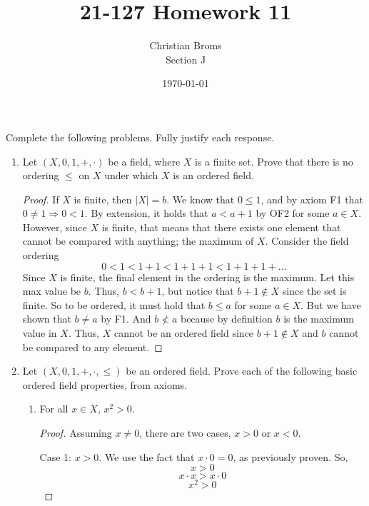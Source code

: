 \documentclass[12pt]{article}
\begin{document}
\title{21-127 Homework 11
}
\author{Christian Broms \\ Section J}
\date{\today}
\maketitle
Complete the following problems. Fully justify each response.


\begin{enumerate}

\item Let $(X, 0, 1, +, \cdot)$ be a field, where $X$ is a finite set. Prove that there is no ordering $\leq$ on $X$ under which $X$ is an ordered field.

\begin{proof}
If $X$ is finite, then $|X| = b$. We know that $0 \leq 1$, and by axiom F1 that $0\neq1 \Rightarrow 0<1$. By extension, it holds that $a < a+1$ by OF2 for some $a \in X$. However, since $X$ is finite, that means that there exists one element that cannot be compared with anything; the maximum of $X$. Consider the field ordering 
$$0 < 1 < 1+1 < 1+1+1< 1+1+1+\ldots$$
Since $X$ is finite, the final element in the ordering is the maximum. Let this max value be $b$. Thus, $b < b+1$, but notice that $b+1 \notin X$ since the set is finite. So to be ordered, it must hold that $b \leq a$ for some $a \in X$. But we have shown that $b\neq a$ by F1. And $b \not< a$ because by definition $b$ is the maximum value in $X$. Thus, $X$ cannot be an ordered field since $b + 1\notin X$ and $b$ cannot be compared to any element. 
\end{proof}

\item Let $(X, 0, 1, +, \cdot, \leq)$ be an ordered field. Prove each of the following basic ordered field properties, from axioms.
\begin{enumerate}
\item For all $x\in X$, $x^2>0$.
\begin{proof}
Assuming $x \neq 0$, 
there are two cases, $x>0$ or $x<0$. 

Case 1: $x>0$. We use the fact that $x \cdot 0 = 0$, as previously proven. So,
$$x >0$$
$$x \cdot x > x \cdot 0$$
$$x^2 > 0$$


\end{proof}
\end{enumerate}
\end{enumerate}
\end{document}
